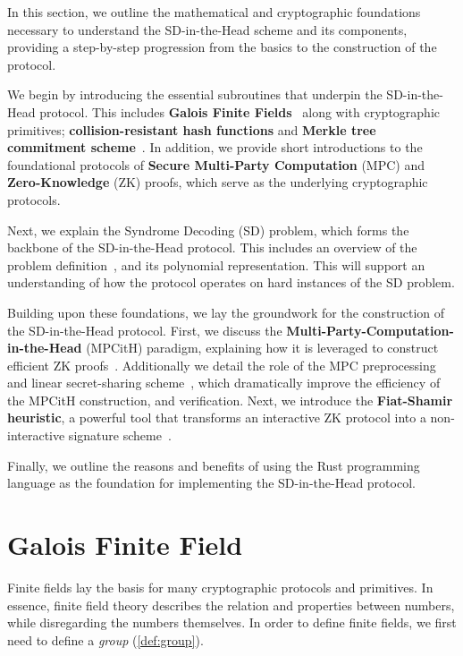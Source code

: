 \documentclass[11pt]{report}
\theoremstyle{definition}
\theoremstyle{plain}
\begin{document}
In this section, we outline the mathematical and cryptographic foundations necessary to understand the SD-in-the-Head scheme and its components, providing a step-by-step progression from the basics to the construction of the protocol.

We begin by introducing the essential subroutines that underpin the SD-in-the-Head protocol. This includes \textbf{Galois Finite Fields}~\cite{martinez2023syndromes, reed1960polynomial, brownadvanced} along with cryptographic primitives; \textbf{collision-resistant hash functions} and \textbf{Merkle tree commitment scheme}~\cite{becker2008merkle}. In addition, we provide short introductions to the foundational protocols of \textbf{Secure Multi-Party Computation} (MPC) and \textbf{Zero-Knowledge} (ZK) proofs, which serve as the underlying cryptographic protocols.

Next, we explain the Syndrome Decoding (SD) problem, which forms the backbone of the SD-in-the-Head protocol. This includes an overview of the problem definition~\cite{aguilarsyndrome11, mceliece1978public, berlekamp1978inherent, baldi2013optimization}, and its polynomial representation. This will support an understanding of how the protocol operates on hard instances of the SD problem.

Building upon these foundations, we lay the groundwork for the construction of the SD-in-the-Head protocol. First, we discuss the \textbf{Multi-Party-Computation-in-the-Head} (MPCitH) paradigm, explaining how it is leveraged to construct efficient ZK proofs~\cite{ishai2007zero}. Additionally we detail the role of the MPC preprocessing~\cite{baum2020concretely} and linear secret-sharing scheme~\cite{feneuil2023threshold}, which dramatically improve the efficiency of the MPCitH construction, and verification. Next, we introduce the \textbf{Fiat-Shamir heuristic}, a powerful tool that transforms an interactive ZK protocol into a non-interactive signature scheme~\cite{fiat1986prove}.

Finally, we outline the reasons and benefits of using the Rust programming language as the foundation for implementing the SD-in-the-Head protocol.


\section{Galois Finite Field}\label{sec:gf256}
Finite fields lay the basis for many cryptographic protocols and primitives. In essence, finite field theory describes the relation and properties between numbers, while disregarding the numbers themselves. In order to define finite fields, we first need to define a \textit{group} (\autoref{def:group}).
\end{document}

